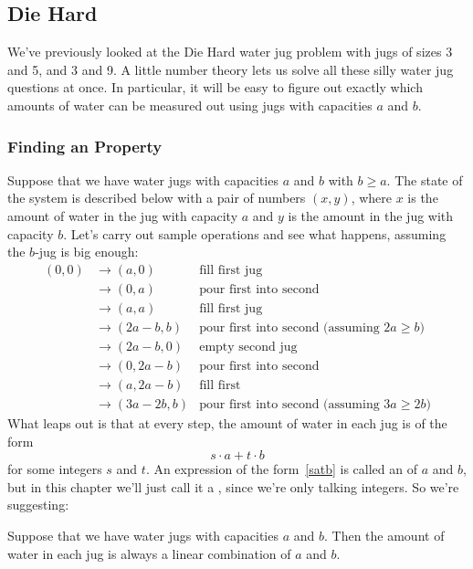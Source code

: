 \subsection{Die Hard}

We've previously looked at the Die Hard water jug problem with jugs of
sizes 3 and 5, and 3 and 9.  A little number theory lets us solve all
these silly water jug questions at once.  In particular, it will be
easy to figure out exactly which amounts of water can be measured out
using jugs with capacities $a$ and $b$.

\subsubsection{Finding an  Property}

Suppose that we have water jugs with capacities $a$ and $b$ with
$b \geq a$.  The state of the system is described below with a pair of
numbers $(x, y)$, where $x$ is the amount of water in the jug with
capacity $a$ and $y$ is the amount in the jug with capacity $b$.
Let's carry out sample operations and see what happens, assuming the
$b$-jug is big enough:
%
\begin{align*}
(0,0)
& \rightarrow (a,0) & \text{fill first jug} \\
& \rightarrow (0,a) & \text{pour first into second} \\
& \rightarrow (a, a) & \text{fill first jug} \\
& \rightarrow (2a-b, b) & \text{pour first into second (assuming $2a \geq b$)} \\
& \rightarrow (2a-b, 0) & \text{empty second jug} \\
& \rightarrow (0, 2a-b) & \text{pour first into second} \\
& \rightarrow (a, 2a-b) & \text{fill first} \\
& \rightarrow (3a-2b, b) & \text{pour first into second (assuming $3a \geq 2b$)}
\end{align*}
%
What leaps out is that at every step, the amount of water in each jug is
of the form
%
\begin{equation}\label{satb}
s \cdot a + t \cdot b
\end{equation}
%
for some integers $s$ and $t$.  An expression of the form~\eqref{satb} is
called an  of $a$ and $b$, but in this
chapter we'll just call it a , since we're only
talking integers.  So we're suggesting:
\begin{lemma}
\label{lem:waterjugs}
Suppose that we have water jugs with capacities $a$ and $b$.  Then the
amount of water in each jug is always a linear combination of $a$ and
$b$.
\end{lemma}

